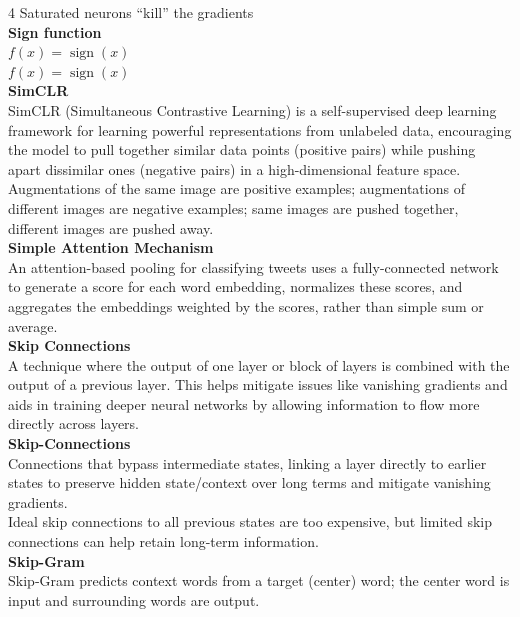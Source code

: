 \documentclass[8pt]{extarticle}
\begin{document}
\begin{multicols}{4}
Saturated neurons ``kill'' the gradients\\
\vspace{2pt}\textbf{Sign function}\\
$f(x)=\operatorname{sign}(x)$\\
$f(x)=\operatorname{sign}(x)$\\
\vspace{2pt}\textbf{SimCLR}\\
SimCLR (Simultaneous Contrastive Learning) is a self-supervised deep learning framework for learning powerful representations from unlabeled data, encouraging the model to pull together similar data points (positive pairs) while pushing apart dissimilar ones (negative pairs) in a high-dimensional feature space.\\
Augmentations of the same image are positive examples; augmentations of different images are negative examples; same images are pushed together, different images are pushed away.\\
\vspace{2pt}\textbf{Simple Attention Mechanism}\\
An attention-based pooling for classifying tweets uses a fully-connected network to generate a score for each word embedding, normalizes these scores, and aggregates the embeddings weighted by the scores, rather than simple sum or average.\\
\vspace{2pt}\textbf{Skip Connections}\\
A technique where the output of one layer or block of layers is combined with the output of a previous layer. This helps mitigate issues like vanishing gradients and aids in training deeper neural networks by allowing information to flow more directly across layers.\\
\vspace{2pt}\textbf{Skip-Connections}\\
Connections that bypass intermediate states, linking a layer directly to earlier states to preserve hidden state/context over long terms and mitigate vanishing gradients.\\
Ideal skip connections to all previous states are too expensive, but limited skip connections can help retain long-term information.\\
\vspace{2pt}\textbf{Skip-Gram}\\
Skip‑Gram predicts context words from a target (center) word; the center word is input and surrounding words are output.\\


\end{multicols}
\end{document}

